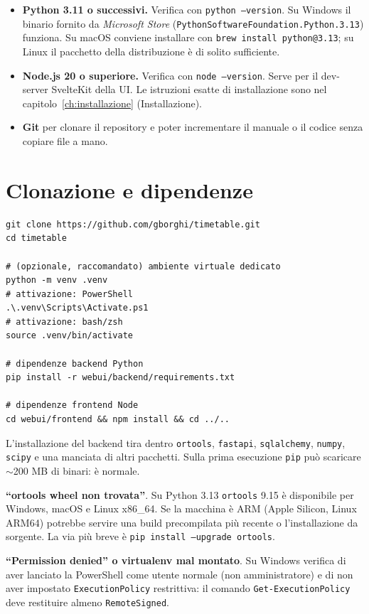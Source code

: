 \begin{itemize}
\item \textbf{Python 3.11 o successivi.} Verifica con
  \texttt{python --version}. Su Windows il binario fornito da
  \emph{Microsoft Store} (\texttt{PythonSoftwareFoundation.Python.3.13})
  funziona. Su macOS conviene installare con
  \texttt{brew install python@3.13}; su Linux il pacchetto della
  distribuzione \`e di solito sufficiente.
\item \textbf{Node.js 20 o superiore.} Verifica con
  \texttt{node --version}. Serve per il dev-server SvelteKit
  della UI. Le istruzioni esatte di installazione sono nel
  capitolo~\ref{ch:installazione} (Installazione).
\item \textbf{Git} per clonare il repository e poter incrementare
  il manuale o il codice senza copiare file a mano.
\end{itemize}

\section{Clonazione e dipendenze}


\begin{lstlisting}[style=shell]
git clone https://github.com/gborghi/timetable.git
cd timetable

# (opzionale, raccomandato) ambiente virtuale dedicato
python -m venv .venv
# attivazione: PowerShell
.\.venv\Scripts\Activate.ps1
# attivazione: bash/zsh
source .venv/bin/activate

# dipendenze backend Python
pip install -r webui/backend/requirements.txt

# dipendenze frontend Node
cd webui/frontend && npm install && cd ../..
\end{lstlisting}

L'installazione del backend tira dentro \texttt{ortools},
\texttt{fastapi}, \texttt{sqlalchemy}, \texttt{numpy}, \texttt{scipy}
e una manciata di altri pacchetti. Sulla prima esecuzione
\texttt{pip} pu\`o scaricare $\sim$200 MB di binari: \`e normale.

\begin{erroricomunibox}
\textbf{``ortools wheel non trovata''}. Su Python 3.13
\texttt{ortools} 9.15 \`e disponibile per Windows, macOS e
Linux x86\_64. Se la macchina \`e ARM (Apple Silicon, Linux
ARM64) potrebbe servire una build precompilata pi\`u recente
o l'installazione da sorgente. La via pi\`u breve \`e
\texttt{pip install --upgrade ortools}.

\textbf{``Permission denied'' o virtualenv mal montato}.
Su Windows verifica di aver lanciato la PowerShell come
utente normale (non amministratore) e di non aver impostato
\texttt{ExecutionPolicy} restrittiva: il comando
\texttt{Get-ExecutionPolicy} deve restituire almeno
\texttt{RemoteSigned}.
\end{erroricomunibox}

